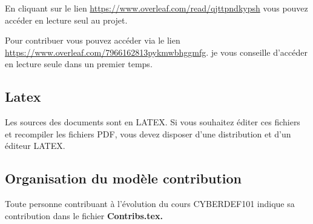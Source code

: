 En cliquant sur le lien \url {https://www.overleaf.com/read/qjttpndkypsh} vous pouvez accéder en lecture seul au projet.

Pour contribuer vous pouvez accéder via le lien  \url{https://www.overleaf.com/7966162813pykmwbhggmfg}. je vous conseille d'accéder en lecture seule dans un premier temps.


\subsection{Latex}

Les sources des documents sont en LATEX. Si vous souhaitez éditer ces fichiers et recompiler les fichiers PDF, vous devez disposer d'une distribution et d'un éditeur LATEX.




\subsection{Organisation du modèle contribution}

Toute personne contribuant à l'évolution du cours CYBERDEF101 indique sa contribution dans le fichier \bf{Contribs.tex}.

